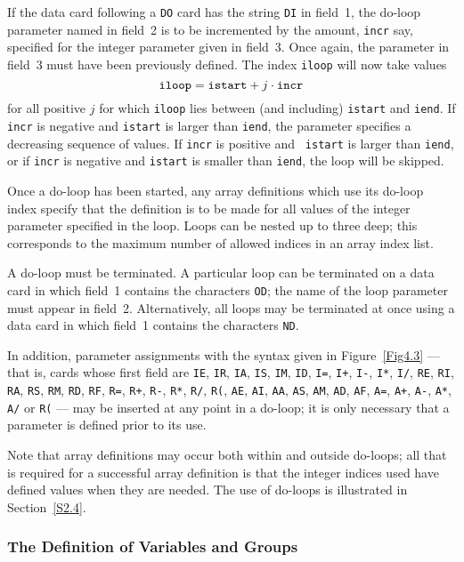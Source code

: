 \documentclass[a4paper]{article}
\newcommand{\bdmath}{\begin{displaymath}}
\newcommand{\edmath}{\end{displaymath}}
\begin{document}
If the data card
following a {\tt DO}
card has the string  {\tt DI}
in field~1,   the  do-loop parameter
named    in   field~2 is    to be
incremented
by the amount,  {\tt incr} say,  specified for the integer
parameter given in field~3.  Once again, the parameter in field~3 must
have been previously  defined.  The  index {\tt  iloop} will now  take
values
\bdmath
{\tt iloop} = {\tt istart}  + j \cdot {\tt incr}
\edmath
for all positive   $j$  for which  {\tt   iloop}  lies   between  (and
including) {\tt istart} and {\tt iend}.  If {\tt incr} is negative and
{\tt istart}  is  larger than  {\tt  iend},  the parameter specifies a
decreasing sequence of  values.   If {\tt incr}  is positive  and {\tt
istart} is larger  than {\tt iend},  or  if {\tt incr} is negative and
{\tt istart} is smaller than {\tt iend}, the loop will be skipped.

Once a do-loop has been  started, any array
definitions  which use its
do-loop index specify that the definition is to be made for all values
of the integer parameter
specified in  the loop.   Loops can be nested
up to three deep;  this corresponds to the  maximum number  of allowed
indices in an array
index list.

A do-loop must be terminated. A particular loop can be terminated on a
data card
in which field~1 contains the characters  {\tt OD};
the name of the loop
parameter must appear in field~2. Alternatively, all loops
may be terminated at once using a data  card in which field~1 contains
the characters {\tt ND}.

In   addition, parameter     assignments with the   syntax  given   in
Figure~\ref{Fig4.3} --- that is, cards  whose first  field are {\tt IE},
{\tt IR}, {\tt IA}, {\tt IS}, {\tt IM}, {\tt ID},  {\tt I=}, {\tt I+},
{\tt I-}, {\tt I*}, {\tt I/}, {\tt RE}, {\tt RI},  {\tt RA}, {\tt RS},
{\tt RM}, {\tt RD}, {\tt RF}, {\tt R=}, {\tt R+}, {\tt  R-}, {\tt R*},
{\tt R/}, {\tt R(}, {\tt AE}, {\tt AI},  {\tt AA}, {\tt AS}, {\tt AM},
{\tt AD}, {\tt AF}, {\tt A=},  {\tt A+}, {\tt  A-}, {\tt A*}, {\tt A/}
or {\tt R(} --- may be inserted at any point in a  do-loop; it is only
necessary that a parameter is defined prior to its use.

Note   that  array
definitions  may  occur  both  within  and  outside
do-loops; all that is required  for  a  successful array definition is
that  the  integer indices   used have   defined values  when they are
needed.  The use of do-loops is illustrated in Section~\ref{S2.4}.

\subsubsection{\label{S2.2.5}The Definition of Variables and Groups}
\end{document}
